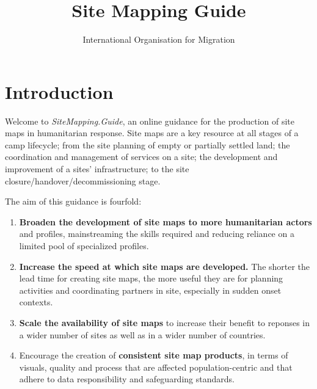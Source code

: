 \documentclass[
  a4paper,
  onecolumn,
  oneside]{book}
\title{Site Mapping Guide}
\author{International Organisation for Migration}
\date{}
\renewcommand*\contentsname{Table of contents}
\newcommand\contentsname{Table of contents}
\begin{document}
\frontmatter
\maketitle
\ifdefined\Shaded\renewenvironment{Shaded}{\begin{tcolorbox}[enhanced, interior hidden, sharp corners, boxrule=0pt, borderline west={3pt}{0pt}{shadecolor}, frame hidden, breakable]}{\end{tcolorbox}}\fi

\renewcommand*\contentsname{Table of contents}
{
\setcounter{tocdepth}{2}
\tableofcontents
}
\listoffigures
\mainmatter
{}

\hypertarget{introduction}{%
\chapter*{Introduction}\label{introduction}}


Welcome to \emph{SiteMapping.Guide}, an online guidance for the
production of site maps in humanitarian response. Site maps are a key
resource at all stages of a camp lifecycle; from the site planning of
empty or partially settled land; the coordination and management of
services on a site; the development and improvement of a sites'
infrastructure; to the site closure/handover/decommissioning stage.

The aim of this guidance is fourfold:

\begin{enumerate}
\def\labelenumi{\arabic{enumi}.}
\item
  \textbf{Broaden the development of site maps to more humanitarian
  actors} and profiles, mainstreaming the skills required and reducing
  reliance on a limited pool of specialized profiles.
\item
  \textbf{Increase the speed at which site maps are developed.} The
  shorter the lead time for creating site maps, the more useful they are
  for planning activities and coordinating partners in site, especially
  in sudden onset contexts.
\item
  \textbf{Scale the availability of site maps} to increase their benefit
  to reponses in a wider number of sites as well as in a wider number of
  countries.
\item
  Encourage the creation of \textbf{consistent site map products}, in
  terms of visuals, quality and process that are affected
  population-centric and that adhere to data responsibility and
  safeguarding standards.
\end{enumerate}
\end{document}
